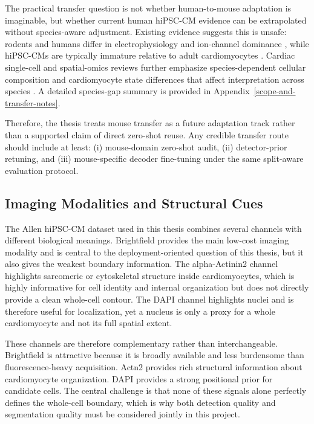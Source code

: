 The practical transfer question is not whether human-to-mouse adaptation is imaginable, but whether current human hiPSC-CM evidence can be extrapolated without species-aware adjustment. Existing evidence suggests this is unsafe: rodents and humans differ in electrophysiology and ion-channel dominance \cite{joukar2021rodent_human_ecg}, while hiPSC-CMs are typically immature relative to adult cardiomyocytes \cite{ahmed2020hipscm_maturation}. Cardiac single-cell and spatial-omics reviews further emphasize species-dependent cellular composition and cardiomyocyte state differences that affect interpretation across species \cite{palmer2024cardiac_omics}. A detailed species-gap summary is provided in Appendix~\ref{scope-and-transfer-notes}.

Therefore, the thesis treats mouse transfer as a future adaptation track rather than a supported claim of direct zero-shot reuse. Any credible transfer route should include at least: (i) mouse-domain zero-shot audit, (ii) detector-prior retuning, and (iii) mouse-specific decoder fine-tuning under the same split-aware evaluation protocol.

\subsection{Imaging Modalities and Structural Cues}\label{imaging-modalities-and-structural-cues}

The Allen hiPSC-CM dataset used in this thesis combines several channels with different biological meanings. Brightfield provides the main low-cost imaging modality and is central to the deployment-oriented question of this thesis, but it also gives the weakest boundary information. The alpha-Actinin2 channel highlights sarcomeric or cytoskeletal structure inside cardiomyocytes, which is highly informative for cell identity and internal organization but does not directly provide a clean whole-cell contour. The DAPI channel highlights nuclei and is therefore useful for localization, yet a nucleus is only a proxy for a whole cardiomyocyte and not its full spatial extent.

These channels are therefore complementary rather than interchangeable. Brightfield is attractive because it is broadly available and less burdensome than fluorescence-heavy acquisition. Actn2 provides rich structural information about cardiomyocyte organization. DAPI provides a strong positional prior for candidate cells. The central challenge is that none of these signals alone perfectly defines the whole-cell boundary, which is why both detection quality and segmentation quality must be considered jointly in this project.

